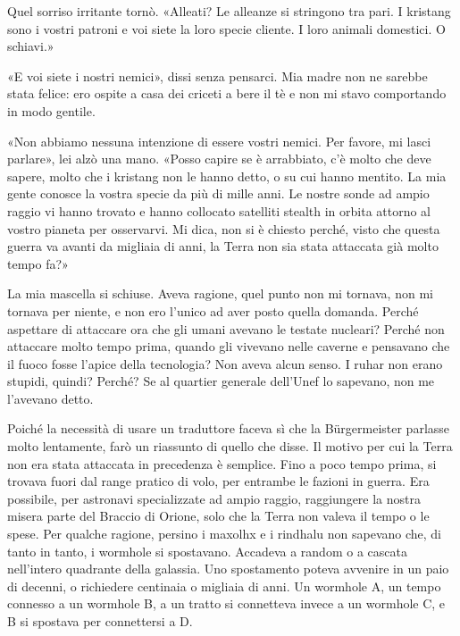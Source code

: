 Quel sorriso irritante tornò. «Alleati? Le alleanze si stringono tra
pari. I kristang sono i vostri patroni e voi siete la loro specie
cliente. I loro animali domestici. O schiavi.»

«E voi siete i nostri nemici», dissi senza pensarci. Mia madre non ne
sarebbe stata felice: ero ospite a casa dei criceti a bere il tè e non
mi stavo comportando in modo gentile.

«Non abbiamo nessuna intenzione di essere vostri nemici. Per favore, mi
lasci parlare», lei alzò una mano. «Posso capire se è arrabbiato, c'è
molto che deve sapere, molto che i kristang non le hanno detto, o su cui
hanno mentito. La mia gente conosce la vostra specie da più di mille
anni. Le nostre sonde ad ampio raggio vi hanno trovato e hanno collocato
satelliti stealth in orbita attorno al vostro pianeta per osservarvi. Mi
dica, non si è chiesto perché, visto che questa guerra va avanti da
migliaia di anni, la Terra non sia stata attaccata già molto tempo fa?»

La mia mascella si schiuse. Aveva ragione, quel punto non mi tornava,
non mi tornava per niente, e non ero l'unico ad aver posto quella
domanda. Perché aspettare di attaccare ora che gli umani avevano le
testate nucleari? Perché non attaccare molto tempo prima, quando gli
vivevano nelle caverne e pensavano che il fuoco fosse l'apice della
tecnologia? Non aveva alcun senso. I ruhar non erano stupidi, quindi?
Perché? Se al quartier generale dell'Unef lo sapevano, non me l'avevano
detto.

Poiché la necessità di usare un traduttore faceva sì che la
Bürgermeister parlasse molto lentamente, farò un riassunto di quello che
disse. Il motivo per cui la Terra non era stata attaccata in precedenza
è semplice. Fino a poco tempo prima, si trovava fuori dal range pratico
di volo, per entrambe le fazioni in guerra. Era possibile, per astronavi
specializzate ad ampio raggio, raggiungere la nostra misera parte del
Braccio di Orione, solo che la Terra non valeva il tempo o le spese. Per
qualche ragione, persino i maxolhx e i rindhalu non sapevano che, di
tanto in tanto, i wormhole si spostavano. Accadeva a random o a cascata
nell'intero quadrante della galassia. Uno spostamento poteva avvenire in
un paio di decenni, o richiedere centinaia o migliaia di anni. Un
wormhole A, un tempo connesso a un wormhole B, a un tratto si connetteva
invece a un wormhole C, e B si spostava per connettersi a D.

